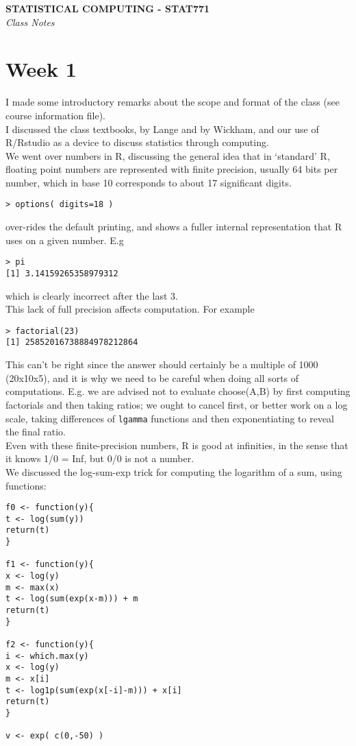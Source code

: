\documentclass[11pt,a4paper]{article}
\begin{document}
\begin{center}
\LARGE{\bf{STATISTICAL COMPUTING - STAT771}}\\
\vspace{0.2cm}
\Large{\emph{Class Notes}}\\
\end{center}

\section*{Week 1}

I made some introductory remarks about the scope and format of the class (see course information file).\\
I discussed the class textbooks, by Lange and by Wickham, and our use of R/Rstudio as a device to discuss statistics through computing.\\
We went over numbers in R, discussing the general idea that in `standard' R, floating point numbers are represented with finite precision, usually 64 bits per number, which in base 10 corresponds to about 17  significant digits.  
\begin{verbatim}
> options( digits=18 )
\end{verbatim}
over-rides the default printing, and shows a fuller internal representation that R uses on a given number. E.g
\begin{verbatim}
> pi
[1] 3.14159265358979312
\end{verbatim}
which is clearly incorrect after the last 3.\\
This lack of full precision  affects computation. For example
\begin{verbatim}
> factorial(23)
[1] 25852016738884978212864
\end{verbatim}
This can't be right since the answer should certainly be a multiple of 1000 (20x10x5), and it is why we need to be careful when doing all sorts of computations.  E.g. we are advised not to evaluate choose(A,B) by first computing factorials and then taking ratios; we ought to cancel first, or better work on a log scale, taking differences of \texttt{lgamma} functions and then exponentiating to reveal the final ratio.\\
Even with these finite-precision numbers, R is good at infinities, in the sense that it knows 1/0 = Inf,  but 0/0 is not a number.\\
We discussed the log-sum-exp trick for computing the logarithm of a sum, using functions:
\begin{verbatim}
f0 <- function(y){
t <- log(sum(y))
return(t)
}

f1 <- function(y){
x <- log(y)
m <- max(x)
t <- log(sum(exp(x-m))) + m
return(t)
}

f2 <- function(y){
i <- which.max(y)
x <- log(y)
m <- x[i]
t <- log1p(sum(exp(x[-i]-m))) + x[i]
return(t)
}

v <- exp( c(0,-50) )
\end{verbatim}
\end{document}
